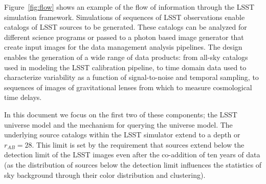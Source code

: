 \documentclass[]{article}
\begin{document}
{Figure~\ref{fig:flow} shows an example of the flow of information
through the LSST simulation framework. Simulations of sequences of
LSST observations enable catalogs of LSST sources to be
generated. These catalogs can be analyzed for different science
programs or passed to a photon based image generator that create input
images for the data management analysis pipelines.  The design enables
the generation of a wide range of data products: from all-sky catalogs
used in modeling the LSST calibration pipeline, to time domain data
used to characterize variability as a function of signal-to-noise and
temporal sampling, to sequences of images of gravitational lenses from
which to measure cosmological time delays.

In this document we focus on the first two of these components; the LSST
universe model and the mechanism for querying the universe model.  
The underlying source catalogs within the LSST
simulator extend to a depth or $r_{AB}=28$. This limit is set by the
requirement that sources extend below the detection limit of the LSST
images even after the co-addition of ten years of data (as the
distribution of sources below the detection limit influences the
statistics of sky background through their color distribution and
clustering).

}
\end{document}
